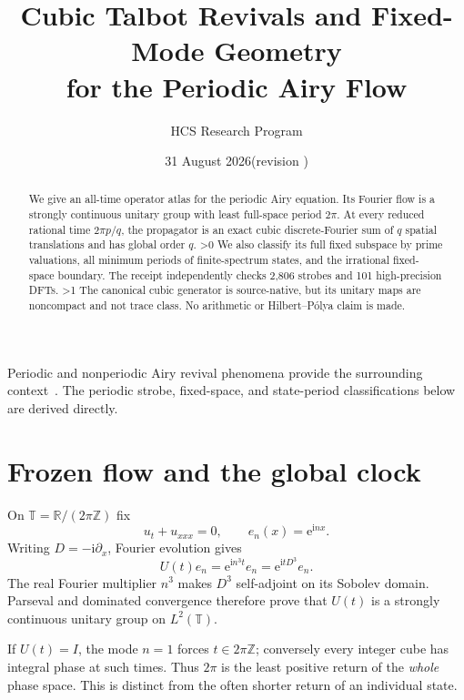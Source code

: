 \documentclass[10pt]{article}
\title{Cubic Talbot Revivals and Fixed-Mode Geometry\\for the Periodic Airy Flow}
\author{HCS Research Program}
\date{31 August 2026\quad (revision \CRevisionRound)}
\newcommand{\T}{\mathbb T}
\newcommand{\Z}{\mathbb Z}
\newcommand{\ee}{\mathrm e}
\newcommand{\ii}{\mathrm i}
\begin{document}
\maketitle
\begin{abstract}
We give an all-time operator atlas for the periodic Airy equation.  Its
Fourier flow is a strongly continuous unitary group with least full-space
period $2\pi$.  At every reduced rational time $2\pi p/q$, the propagator is
an exact cubic discrete-Fourier sum of $q$ spatial translations and has
global order $q$.
\ifnum\CRevisionRound>0
We also classify its full fixed subspace by prime valuations, all minimum
periods of finite-spectrum states, and the irrational fixed-space boundary.
The receipt independently checks 2,806 strobes and 101 high-precision DFTs.
\fi
\ifnum\CRevisionRound>1
The canonical cubic generator is source-native, but its unitary maps are
noncompact and not trace class.  No arithmetic or Hilbert--P\'olya claim is
made.
\fi
\end{abstract}

Periodic and nonperiodic Airy revival phenomena provide the surrounding
context~\cite{Pelloni2024,Boulton2021}.  The periodic strobe, fixed-space,
and state-period classifications below are derived directly.

\section{Frozen flow and the global clock}
On $\T=\mathbb R/(2\pi\Z)$ fix
\begin{equation}
 u_t+u_{xxx}=0,\qquad e_n(x)=\ee^{\ii nx}.                 \label{eq:airy}
\end{equation}
Writing $D=-\ii\partial_x$, Fourier evolution gives
\begin{equation}
 U(t)e_n=\ee^{\ii n^3t}e_n=\ee^{\ii tD^3}e_n.             \label{eq:mode}
\end{equation}
The real Fourier multiplier $n^3$ makes $D^3$ self-adjoint on its Sobolev
domain.  Parseval and dominated convergence therefore prove that $U(t)$ is
a strongly continuous unitary group on $L^2(\T)$.

If $U(t)=I$, the mode $n=1$ forces $t\in2\pi\Z$; conversely every integer
cube has integral phase at such times.  Thus $2\pi$ is the least positive
return of the \emph{whole} phase space.  This is distinct from the often
shorter return of an individual state.
\end{document}
